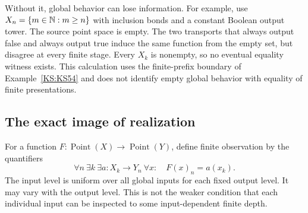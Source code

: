 Without it, global behavior can lose information. For example, use \(X_n=\{m\in\mathbb N:m\ge n\}\) with inclusion bonds and a constant Boolean output tower. The source point space is empty. The two transports that always output false and always output true induce the same function from the empty set, but disagree at every finite stage. Every \(X_k\) is nonempty, so no eventual equality witness exists. This calculation uses the finite-prefix boundary of Example~\ref{KS:KS54} and does not identify empty global behavior with equality of finite presentations.

\subsection{The exact image of realization}
For a function \(F:\operatorname{Point}(X)\to\operatorname{Point}(Y)\), define finite observation by the quantifiers
\begin{equation}\label{KS:eq:finite-observation}
 \forall n\ \exists k\ \exists a:X_k\to Y_n\ \forall x:\quad
 F(x)_n=a(x_k).
\end{equation}
The input level is uniform over all global inputs for each fixed output level. It may vary with the output level. This is not the weaker condition that each individual input can be inspected to some input-dependent finite depth.


